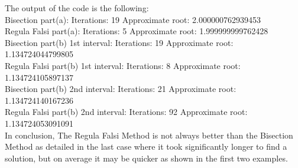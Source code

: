 \documentclass{amsart}
\begin{document}
    The output of the code is the following:\\
    Bisection part(a): Iterations: 19   Approximate root: 2.000000762939453\\
    Regula Falsi part(a): Iterations: 5  Approximate root: 1.999999999762428\\
    Bisection part(b) 1st interval: Iterations: 19   Approximate root: 1.134724044799805\\
    Regula Falsi part(b) 1st interval: Iterations: 8  Approximate root: 1.134724105897137\\
    Bisection part(b) 2nd interval: Iterations: 21   Approximate root: 1.134724140167236\\
    Regula Falsi part(b) 2nd interval: Iterations: 92  Approximate root: 1.134724053091091\\
    In conclusion, The Regula Falsi Method is not always better than the Bisection Method as detailed in the last case where it took significantly longer to find a solution, but on average
    it may be quicker as shown in the first two examples.
\end{document}
